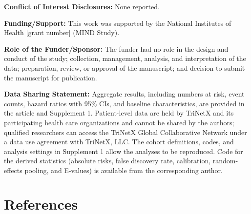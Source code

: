 \documentclass[11pt]{article}
\begin{document}
\textbf{Conflict of Interest Disclosures:} None reported.

\textbf{Funding/Support:} This work was supported by the National Institutes of Health {[}grant number{]} (MIND Study).

\textbf{Role of the Funder/Sponsor:} The funder had no role in the design and conduct of the study; collection, management, analysis, and interpretation of the data; preparation, review, or approval
of the manuscript; and decision to submit the manuscript for publication.

\textbf{Data Sharing Statement:} Aggregate results, including numbers at risk, event counts, hazard ratios with 95\% CIs, and baseline characteristics, are provided in the article and Supplement 1.
Patient-level data are held by TriNetX and its participating health care organizations and cannot be shared by the authors; qualified researchers can access the TriNetX Global Collaborative Network
under a data use agreement with TriNetX, LLC. The cohort definitions, codes, and analysis settings in Supplement 1 allow the analyses to be reproduced. Code for the derived statistics (absolute risks,
false discovery rate, calibration, random-effects pooling, and E-values) is available from the corresponding author.

\newpage
\hypertarget{references}{%
\section*{References}\label{references}}
\end{document}
